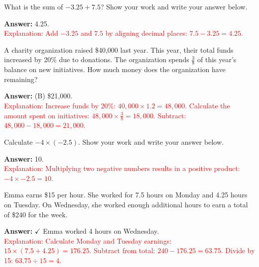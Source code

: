 \documentclass[12pt]{article}
\begin{document}
\begin{tcolorbox}[colframe=black!50, colback=white, title=\textbf{Problem 3 (7.NS.A.1)}]
What is the sum of \( -3.25 + 7.5 \)? Show your work and write your answer below.

\textbf{Answer:} 4.25.\\
\textcolor{red}{Explanation: Add \(-3.25\) and \(7.5\) by aligning decimal places: \(7.5 - 3.25 = 4.25\).}
\end{tcolorbox}

\begin{tcolorbox}[colframe=black!50, colback=white, title=\textbf{Problem 4 (7.RP.A.3)}]
A charity organization raised \$40,000 last year. This year, their total funds increased by 20\% due to donations. The organization spends \(\frac{3}{8}\) of this year's balance on new initiatives. How much money does the organization have remaining?

\textbf{Answer:} (B) \$21,000.\\
\textcolor{red}{Explanation: Increase funds by 20\%: \(40,000 \times 1.2 = 48,000\). Calculate the amount spent on initiatives: \(48,000 \times \frac{3}{8} = 18,000\). Subtract: \(48,000 - 18,000 = 21,000\).}
\end{tcolorbox}

\begin{tcolorbox}[colframe=black!50, colback=white, title=\textbf{Problem 5 (7.NS.A.2)}]
Calculate \( -4 \times (-2.5) \). Show your work and write your answer below.

\textbf{Answer:} 10.\\
\textcolor{red}{Explanation: Multiplying two negative numbers results in a positive product: \(-4 \times -2.5 = 10\).}
\end{tcolorbox}

\begin{tcolorbox}[colframe=black!50, colback=white, title=\textbf{Problem 6 (7.EE.B.3)}]
Emma earns \$15 per hour. She worked for 7.5 hours on Monday and 4.25 hours on Tuesday. On Wednesday, she worked enough additional hours to earn a total of \$240 for the week.

\textbf{Answer:} \(\checkmark\) Emma worked 4 hours on Wednesday.\\
\textcolor{red}{Explanation: Calculate Monday and Tuesday earnings: \(15 \times (7.5 + 4.25) = 176.25\). Subtract from total: \(240 - 176.25 = 63.75\). Divide by 15: \(63.75 \div 15 = 4\).}
\end{tcolorbox}
\end{document}
